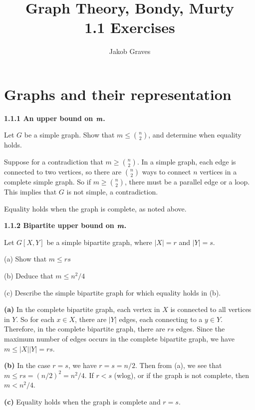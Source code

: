 \documentclass{article}
\author{Jakob Graves}
\title{Graph Theory, Bondy, Murty \\ 1.1 Exercises}
\begin{document}
\maketitle

\section{Graphs and their representation}
\bigskip
\textbf{1.1.1 An upper bound on $\textit{\textbf{m}}$.}
\par\smallskip
Let $G$ be a simple graph. Show that $m \leq {n \choose 2}$, and determine when equality holds. 
\par\medskip Suppose for a contradiction that $m \geq {n \choose 2}$. In a simple graph, each edge is connected to two vertices, so there are ${n \choose 2}$ ways to connect $n$ vertices in a complete simple graph. So if $m \geq {n \choose 2}$, there must be a parallel edge or a loop. This implies that $G$ is not simple, a contradiction. 
\par Equality holds when the graph is complete, as noted above.

\bigskip\par\noindent\textbf{1.1.2 Bipartite upper bound on $\textit{\textbf{m}}$.} 
\par\smallskip
Let $G[X, Y]$ be a simple bipartite graph, where $|X|=r$ and $|Y|=s$.
\par\noindent (a) Show that $m\leq rs$
\par\noindent (b) Deduce that $m\leq n^2/4$
\par\noindent (c) Describe the simple bipartite graph for which equality holds in (b). 
\par\medskip\noindent
\textbf{(a)} In the complete bipartite graph, each vertex in $X$ is connected to all vertices in $Y$. So for each $x \in X$, there are $|Y|$ edges, each connecting to a $y \in Y$. Therefore, in the complete bipartite graph, there are $rs$ edges. Since the maximum number of edges occurs in the complete bipartite graph, we have $m\leq |X||Y|=rs$.
\par\noindent \textbf{(b)} In the case $r=s$, we have $r=s=n/2$. Then from (a), we see that $m\leq rs = (n/2)^2=n^2/4$. If $r<s$ (wlog), or if the graph is not complete, then $m<n^2/4$.
\par\noindent\textbf{(c)} Equality holds when the graph is complete and $r=s$.
\end{document}
